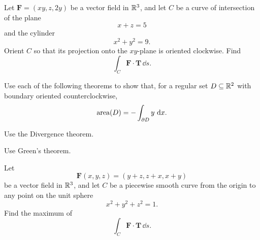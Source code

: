 \begin{problem}
Let $\mathbf F=(xy, z, 2y)$ be a vector field in $\mathbb{R}^3$, and let $C$ be a curve of intersection of the plane
\[
x+z=5
\]
and the cylinder
\[
x^2+y^2=9.
\]
Orient $C$ so that its projection onto the $xy$-plane is oriented clockwise. Find
\[
\int_C\mathbf F\cdot\mathbf T\,\dd s.
\]
\end{problem}

\begin{problem}
Use each of the following theorems to show that, for a regular set $D\subseteq\mathbb{R}^2$ with boundary oriented counterclockwise,
\[
\operatorname{area}(D)=-\int_{\partial D}y\,\mathop{}\!\mathrm{d} x.
\]
\begin{problemsubparts}
\item Use the Divergence theorem.
\item Use Green's theorem.
\end{problemsubparts}
\end{problem}

\begin{problem}
Let
\[
\mathbf F(x, y, z)=(y+z, z+x, x+y)
\]
be a vector field in $\mathbb{R}^3$, and let $C$ be a piecewise smooth curve from the origin to any point on the unit sphere
\[
x^2+y^2+z^2=1.
\]
Find the maximum of
\[
\int_C\mathbf F\cdot\mathbf T\,\dd s.
\]
\end{problem}

